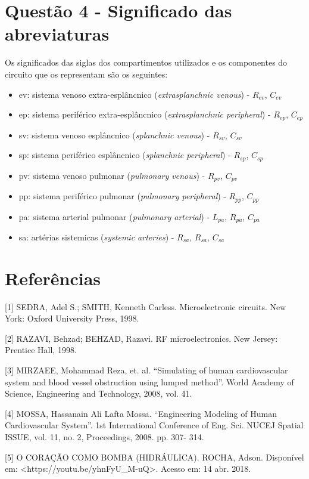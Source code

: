 \documentclass{abntex2}
\begin{document}
\section{Questão 4 - Significado das abreviaturas}

Os significados das siglas dos compartimentos utilizados e os componentes do circuito que os representam são os seguintes:

\begin{itemize}
  \item {ev: sistema venoso extra-esplâncnico (\emph{extrasplanchnic venous}) - $R_{ev}$, $C_{ev}$}
  \item {ep: sistema periférico extra-esplâncnico (\emph{extrasplanchnic peripheral}) - $R_{ep}$, $C_{ep}$}
  \item {sv: sistema venoso esplâncnico (\emph{splanchnic venous}) - $R_{sv}$, $C_{sv}$}
  \item {sp: sistema periférico esplâncnico (\emph{splanchnic peripheral}) - $R_{sp}$, $C_{sp}$}
  \item {pv: sistema venoso pulmonar (\emph{pulmonary venous}) - $R_{pv}$, $C_{pv}$}
  \item {pp: sistema periférico pulmonar (\emph{pulmonary peripheral}) - $R_{pp}$, $C_{pp}$}
  \item {pa: sistema arterial pulmonar (\emph{pulmonary arterial}) - $L_{pa}$, $R_{pa}$, $C_{pa}$}
  \item {sa: artérias sistemicas (\emph{systemic arteries}) - $R_{sa}$, $R_{sa}$, $C_{sa}$}
\end{itemize}

\section*{Referências}


[1] SEDRA, Adel S.; SMITH, Kenneth Carless. Microelectronic circuits. New York: Oxford University Press, 1998.

[2] RAZAVI, Behzad; BEHZAD, Razavi. RF microelectronics. New Jersey: Prentice Hall, 1998.

[3] MIRZAEE, Mohammad Reza, et. al. “Simulating of human cardiovascular system and blood vessel
obstruction using lumped method”. World Academy of Science, Engineering and Technology, 2008, vol.
41.

[4] MOSSA, Hassanain Ali Lafta Mossa. “Engineering Modeling of Human Cardiovascular System”. 1st
International Conference of Eng. Sci. NUCEJ Spatial ISSUE, vol. 11, no. 2, Proceedings, 2008. pp. 307-
314.

[5] O CORAÇÃO COMO BOMBA (HIDRÁULICA). ROCHA,  Adson. Disponível em: <https://youtu.be/yhnFyU_M-uQ>. Acesso em: 14 abr. 2018.
\end{document}
